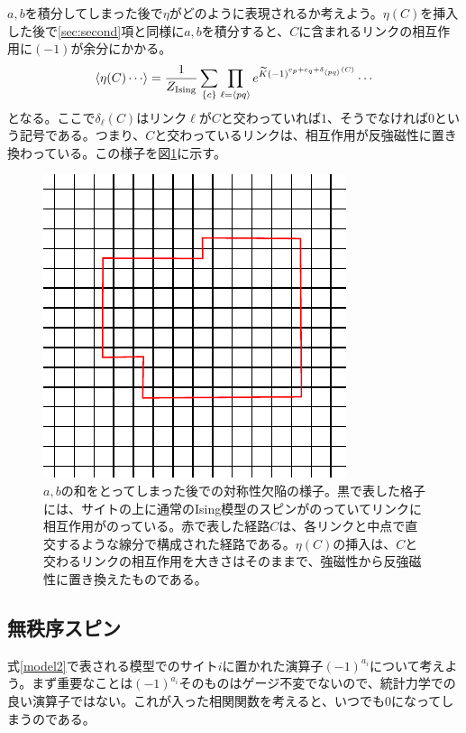 \documentclass[a4paper,12pt,dvipdfmx]{jlreq}
\newcommand{\Kt}{\widetilde{K}}
\newcommand{\ZIs}{Z_{\mathrm{Ising}}}
\begin{document}
$a,b$を積分してしまった後で$\eta$がどのように表現されるか考えよう。$\eta(C)$を挿入した後で\ref{sec:second}項と同様に$a,b$を積分すると、$C$に含まれるリンクの相互作用に$(-1)$が余分にかかる。
\begin{align}
  \expval{\eta(C)\cdots}
  =\frac{1}{\ZIs}\sum_{\{c\}}\prod_{\ell=\expval{pq}} e^{\Kt(-1)^{c_p+c_q+\delta_{\expval{pq}}(C)}}\cdots
\end{align}
となる。ここで$\delta_{\ell}(C)$はリンク$\ell$が$C$と交わっていれば$1$、そうでなければ$0$という記号である。つまり、$C$と交わっているリンクは、相互作用が反強磁性に置き換わっている。この様子を図\ref{fig:z2defect}に示す。


\begin{figure}[htbp]
  \centering
  \includegraphics{z2defect.pdf}
  \caption{$a,b$の和をとってしまった後での対称性欠陥の様子。黒で表した格子には、サイトの上に通常のIsing模型のスピンがのっていてリンクに相互作用がのっている。赤で表した経路$C$は、各リンクと中点で直交するような線分で構成された経路である。$\eta(C)$の挿入は、$C$と交わるリンクの相互作用を大きさはそのままで、強磁性から反強磁性に置き換えたものである。}
  \label{fig:z2defect}
\end{figure}
\subsection{無秩序スピン}
式\eqref{model2}で表される模型でのサイト$i$に置かれた演算子$(-1)^{a_i}$について考えよう。まず重要なことは$(-1)^{a_i}$そのものはゲージ不変でないので、統計力学での良い演算子ではない。これが入った相関関数を考えると、いつでも$0$になってしまうのである。
\end{document}

